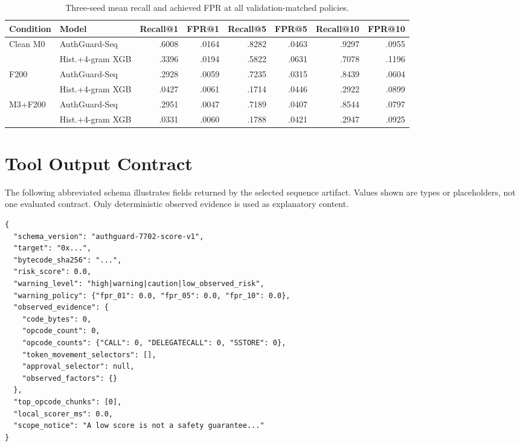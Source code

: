 \documentclass[conference]{IEEEtran}
\begin{document}
\begin{table}[h]
  \centering
  \caption{Three-seed mean recall and achieved FPR at all validation-matched policies.}
  \label{tab:operating-full}
  \scriptsize
  \setlength{\tabcolsep}{4.2pt}
  \begin{tabular}{@{}llrrrrrr@{}}
    \toprule
    Condition & Model & Recall@1 & FPR@1 & Recall@5 & FPR@5 & Recall@10 & FPR@10 \\
    \midrule
    Clean M0 & AuthGuard-Seq & .6008 & .0164 & .8282 & .0463 & .9297 & .0955 \\
             & Hist.+4-gram XGB & .3396 & .0194 & .5822 & .0631 & .7078 & .1196 \\
    F200 & AuthGuard-Seq & .2928 & .0059 & .7235 & .0315 & .8439 & .0604 \\
         & Hist.+4-gram XGB & .0427 & .0061 & .1714 & .0446 & .2922 & .0899 \\
    M3+F200 & AuthGuard-Seq & .2951 & .0047 & .7189 & .0407 & .8544 & .0797 \\
            & Hist.+4-gram XGB & .0331 & .0060 & .1788 & .0421 & .2947 & .0925 \\
    \bottomrule
  \end{tabular}
\end{table}

\section{Tool Output Contract}
\label{app:tool}

The following abbreviated schema illustrates fields returned by the selected sequence artifact.
Values shown are types or placeholders, not one evaluated contract. Only deterministic observed
evidence is used as explanatory content.

\begin{lstlisting}[language={}]
{
  "schema_version": "authguard-7702-score-v1",
  "target": "0x...",
  "bytecode_sha256": "...",
  "risk_score": 0.0,
  "warning_level": "high|warning|caution|low_observed_risk",
  "warning_policy": {"fpr_01": 0.0, "fpr_05": 0.0, "fpr_10": 0.0},
  "observed_evidence": {
    "code_bytes": 0,
    "opcode_count": 0,
    "opcode_counts": {"CALL": 0, "DELEGATECALL": 0, "SSTORE": 0},
    "token_movement_selectors": [],
    "approval_selector": null,
    "observed_factors": {}
  },
  "top_opcode_chunks": [0],
  "local_scorer_ms": 0.0,
  "scope_notice": "A low score is not a safety guarantee..."
}
\end{lstlisting}
\end{document}
